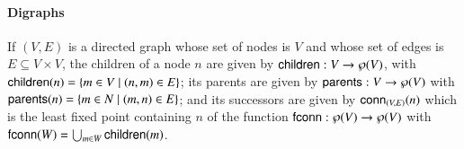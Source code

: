 \paragraph*{Digraphs}
If $(V,E)$ is a directed graph whose set of nodes is $V$ and whose set of edges is $E \subseteq V\times V$,
the children of a node $n$ are given by
$\mathsf{children}: V \to \wp(V)$, with
$\mathsf{children}(n) = \{ m\in V\mid (n,m)\in E\}$;
its parents are given by
$\mathsf{parents}: V \to \wp(V)$ with
$\mathsf{parents}(n) = \{ m\in N\mid (m,n)\in E\}$;
and its successors are given by
$\mathsf{conn}_{(V,E)}(n)$ which is the least fixed point containing $n$
of the function
$\mathsf{f}\mathsf{conn}:\wp(V)\to \wp(V)$
with $\mathsf{f}\mathsf{conn}(W) = \bigcup_{m\in W} \mathsf{children}(m)$.


